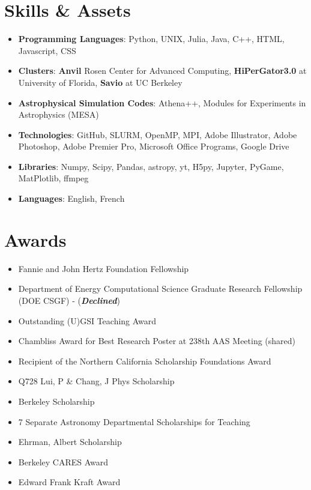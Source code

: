\documentclass[letterpaper,10pt]{article}
\newcommand{\resumeSubHeadingListStart}{\begin{itemize}[leftmargin=*]}
\newcommand{\resumeSubHeadingListEnd}{\end{itemize}}
\newcommand{\shorterSection}[1]{\vspace{-10pt}\section{#1}}
\begin{document}
\shorterSection{Skills \& Assets}
  \resumeSubHeadingListStart
  \small
    \item{
     \textbf{Programming Languages}{: Python, UNIX, Julia, Java, C++, HTML, Javascript, CSS}
    }
    \vspace{-3pt}
    \item{
     \textbf{Clusters}{: \textbf{Anvil} Rosen Center for Advanced Computing, \textbf{HiPerGator3.0} at University of Florida, \textbf{Savio} at UC Berkeley}
    }
    \vspace{-3pt}
    \item{
     \textbf{Astrophysical Simulation Codes}{: Athena++, Modules for Experiments in Astrophysics (MESA)}
    }
    \vspace{-3pt}
    \item{
     \textbf{Technologies}{: GitHub, SLURM, OpenMP, MPI, Adobe Illustrator, Adobe Photoshop, Adobe Premier Pro, Microsoft Office Programs, Google Drive}
    }
    \vspace{-3pt}
    \item{
     \textbf{Libraries}{: Numpy, Scipy, Pandas, astropy, yt, H5py, Jupyter, PyGame, MatPlotlib, ffmpeg}
    }
    \vspace{-3pt}
    \item{
     \textbf{Languages}{: English, French}
    }
\resumeSubHeadingListEnd


\shorterSection{Awards}
  \resumeSubHeadingListStart
  \small
    \item{Fannie and John Hertz Foundation Fellowship}
    \vspace{-3pt}
    \item{Department of Energy Computational Science Graduate Research Fellowship (DOE CSGF) - (\textbf{\textit{Declined}})}
    \vspace{-3pt}
    \item{Outstanding (U)GSI Teaching Award}
    \vspace{-3pt}
    \item{Chambliss Award for Best Research Poster at 238th AAS Meeting (shared)}
    \vspace{-3pt}
    \item{Recipient of the Northern California Scholarship Foundations Award}
    \vspace{-3pt}
    \item{Q728 Lui, P \& Chang, J Phys Scholarship}
    \vspace{-3pt}
    \item{Berkeley Scholarship}
    \vspace{-3pt}
    \item{7 Separate Astronomy Departmental Scholarships for Teaching}
    \vspace{-3pt}
    \item{Ehrman, Albert Scholarship}
    \vspace{-3pt}
    \item{Berkeley CARES Award}
    \vspace{-3pt}
    \item{Edward Frank Kraft Award}
  \resumeSubHeadingListEnd
\end{document}
